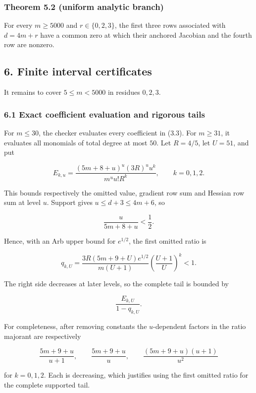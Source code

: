 \documentclass[
  11pt,
  a4paper,
]{article}
\begin{document}
\subsubsection{Theorem 5.2 (uniform analytic
branch)}\label{theorem-5.2-uniform-analytic-branch}

For every \(m\ge5000\) and \(r\in\{0,2,3\}\), the first three rows
associated with \(d=4m+r\) have a common zero at which their anchored
Jacobian and the fourth row are nonzero.

\subsection{6. Finite interval
certificates}\label{finite-interval-certificates}

It remains to cover \(5\le m<5000\) in residues \(0,2,3\).

\subsubsection{6.1 Exact coefficient evaluation and rigorous
tails}\label{exact-coefficient-evaluation-and-rigorous-tails}

For \(m\le30\), the checker evaluates every coefficient in (3.3). For
\(m\ge31\), it evaluates all monomials of total degree at most \(50\).
Let \(R=4/5\), let \(U=51\), and put

\[
E_{k,u}=
\frac{(5m+8+u)^u(3R)^u u^k}{m^u u!R^k},
\qquad k=0,1,2.
\tag{6.1}
\]

This bounds respectively the omitted value, gradient row sum and Hessian
row sum at level \(u\). Support gives \(u\le d+3\le4m+6\), so

\[
\frac{u}{5m+8+u}<\frac12.
\]

Hence, with an Arb upper bound for \(e^{1/2}\), the first omitted ratio
is

\[
q_{k,U}=
\frac{3R(5m+9+U)e^{1/2}}{m(U+1)}
\left(\frac{U+1}{U}\right)^k<1.
\tag{6.2}
\]

The right side decreases at later levels, so the complete tail is
bounded by

\[
\frac{E_{k,U}}{1-q_{k,U}}.
\tag{6.3}
\]

For completeness, after removing constants the \(u\)-dependent factors
in the ratio majorant are respectively

\[
\frac{5m+9+u}{u+1},\qquad
\frac{5m+9+u}{u},\qquad
\frac{(5m+9+u)(u+1)}{u^2}
\]

for \(k=0,1,2\). Each is decreasing, which justifies using the first
omitted ratio for the complete supported tail.
\end{document}
